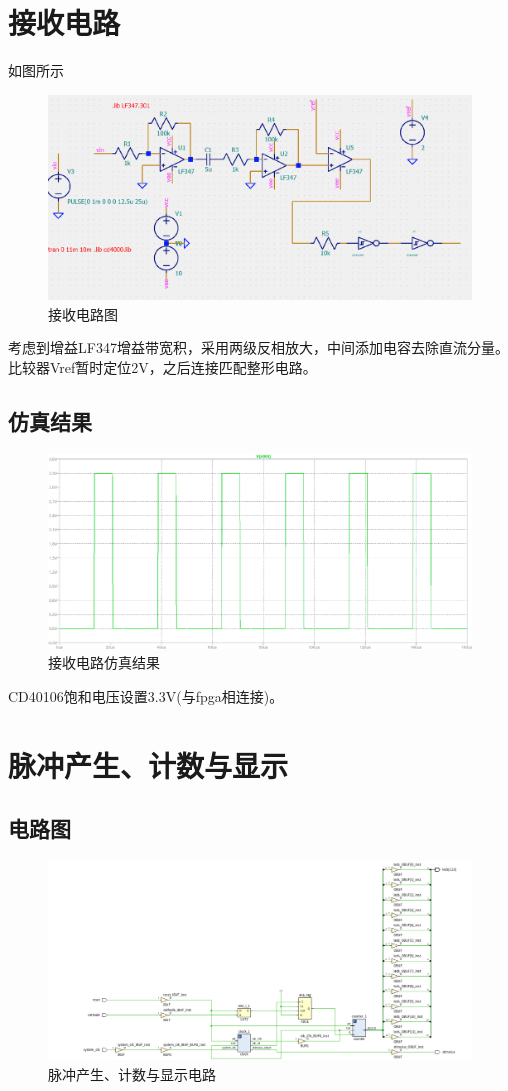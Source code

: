 \documentclass{article}
\begin{document}
\section{接收电路}
如图所示
\begin{figure}[H]
    \centering
    \includegraphics[width = 12cm]{images/rx_cir.png}
    \caption{接收电路图}\label{fig3}
\end{figure}
考虑到增益LF347增益带宽积，采用两级反相放大，中间添加电容去除直流分量。比较器Vref暂时定位2V，之后连接匹配整形电路。
\subsection{仿真结果}
\begin{figure}[H]
    \centering
    \includegraphics[width = 12cm]{images/rx_waveform.png}
    \caption{接收电路仿真结果}\label{fig4}
\end{figure}
CD40106饱和电压设置3.3V(与fpga相连接)。

\section{脉冲产生、计数与显示}
\subsection{电路图}
\begin{figure}[H]
    \centering
    \includegraphics[width = 12cm]{images/schematic.png}
    \caption{脉冲产生、计数与显示电路}\label{fig5}
\end{figure}
\end{document}
